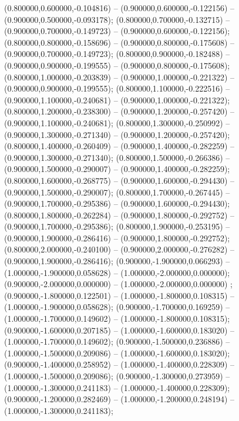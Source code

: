  (0.800000,0.600000,-0.104816) -- (0.900000,0.600000,-0.122156) -- (0.900000,0.500000,-0.093178);
 (0.800000,0.700000,-0.132715) -- (0.900000,0.700000,-0.149723) -- (0.900000,0.600000,-0.122156);
 (0.800000,0.800000,-0.158696) -- (0.900000,0.800000,-0.175608) -- (0.900000,0.700000,-0.149723);
 (0.800000,0.900000,-0.182488) -- (0.900000,0.900000,-0.199555) -- (0.900000,0.800000,-0.175608);
 (0.800000,1.000000,-0.203839) -- (0.900000,1.000000,-0.221322) -- (0.900000,0.900000,-0.199555);
 (0.800000,1.100000,-0.222516) -- (0.900000,1.100000,-0.240681) -- (0.900000,1.000000,-0.221322);
 (0.800000,1.200000,-0.238300) -- (0.900000,1.200000,-0.257420) -- (0.900000,1.100000,-0.240681);
 (0.800000,1.300000,-0.250992) -- (0.900000,1.300000,-0.271340) -- (0.900000,1.200000,-0.257420);
 (0.800000,1.400000,-0.260409) -- (0.900000,1.400000,-0.282259) -- (0.900000,1.300000,-0.271340);
 (0.800000,1.500000,-0.266386) -- (0.900000,1.500000,-0.290007) -- (0.900000,1.400000,-0.282259);
 (0.800000,1.600000,-0.268775) -- (0.900000,1.600000,-0.294430) -- (0.900000,1.500000,-0.290007);
 (0.800000,1.700000,-0.267445) -- (0.900000,1.700000,-0.295386) -- (0.900000,1.600000,-0.294430);
 (0.800000,1.800000,-0.262284) -- (0.900000,1.800000,-0.292752) -- (0.900000,1.700000,-0.295386);
 (0.800000,1.900000,-0.253195) -- (0.900000,1.900000,-0.286416) -- (0.900000,1.800000,-0.292752);
 (0.800000,2.000000,-0.240100) -- (0.900000,2.000000,-0.276282) -- (0.900000,1.900000,-0.286416);
 (0.900000,-1.900000,0.066293) -- (1.000000,-1.900000,0.058628) -- (1.000000,-2.000000,0.000000);
 (0.900000,-2.000000,0.000000) -- (1.000000,-2.000000,0.000000) ;
 (0.900000,-1.800000,0.122501) -- (1.000000,-1.800000,0.108315) -- (1.000000,-1.900000,0.058628);
 (0.900000,-1.700000,0.169259) -- (1.000000,-1.700000,0.149602) -- (1.000000,-1.800000,0.108315);
 (0.900000,-1.600000,0.207185) -- (1.000000,-1.600000,0.183020) -- (1.000000,-1.700000,0.149602);
 (0.900000,-1.500000,0.236886) -- (1.000000,-1.500000,0.209086) -- (1.000000,-1.600000,0.183020);
 (0.900000,-1.400000,0.258952) -- (1.000000,-1.400000,0.228309) -- (1.000000,-1.500000,0.209086);
 (0.900000,-1.300000,0.273959) -- (1.000000,-1.300000,0.241183) -- (1.000000,-1.400000,0.228309);
 (0.900000,-1.200000,0.282469) -- (1.000000,-1.200000,0.248194) -- (1.000000,-1.300000,0.241183);

